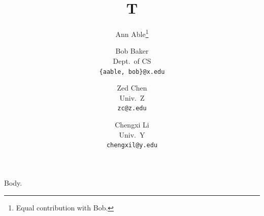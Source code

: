 \documentclass{article}
\title{T}
\author{Ann Able\thanks{Equal contribution with Bob.} \and Bob Baker\\ Dept.\ of CS\\ \texttt{\{aable, bob\}@x.edu}
  \and Zed Chen\\ Univ.\ Z\\ \texttt{zc@z.edu} \and Chengxi Li\\ Univ.\ Y\\ \texttt{chengxil@y.edu}}
\begin{document}
\maketitle
Body.
\end{document}
